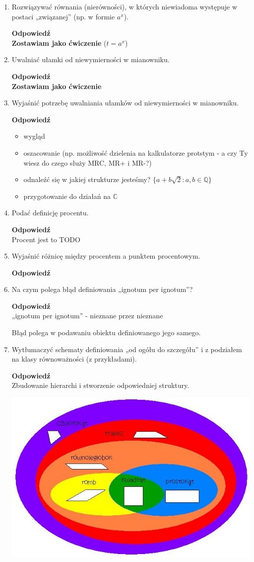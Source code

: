 \documentclass[12pt,a4paper]{article}
\theoremstyle{break}
\newcommand{\Odp}[1]{
		\begin{mdframed}[style=zadanie]
			\textbf{Odpowiedź}\\
			#1
		\end{mdframed}
	}
\begin{document}
\begin{enumerate}[1.]
	\item Rozwiązywać równania (nierówności), w których niewiadoma występuje w postaci	„związanej” (np. w formie $a^x$).
	\Odp{
		\textbf{Zostawiam jako ćwiczenie} ($t=a^x$)
	}
	
	\item Uwalniać ułamki od niewymierności w mianowniku.
	\Odp{
		\textbf{Zostawiam jako ćwiczenie}
	}
	
	\item Wyjaśnić potrzebę uwalniania ułamków od niewymierności w mianowniku.
	\Odp{
		\begin{itemize}
			\item wygląd
			\item oszacowanie (np. możliwość dzielenia na kalkulatorze protstym - a czy Ty wiesz do czego służy MRC, MR+ i MR-?)
			\item odnaleźć się w jakiej strukturze jesteśmy? $\{a+b\sqrt{2} : a,b\in\mathbb{Q}\}$
			\item przygotowanie do działań na $\mathbb{C}$
		\end{itemize}
	}
	
	\item Podać definicję procentu.
	\Odp{
		Procent jest to TODO
	}
	
	\item Wyjaśnić różnicę między procentem a punktem procentowym.
	\Odp{
	
	}
	
	\item Na czym polega błąd definiowania „ignotum per ignotum”?
	\Odp{
		„ignotum per ignotum” - nieznane przez nieznane
		
		Błąd polega w podawaniu obiektu definiowanego jego samego.  
	}
	
	\item Wytłumaczyć schematy definiowania „od ogółu do szczegółu” i z podziałem na klasy równoważności (z przykładami).
	\Odp{
		Zbudowanie hierarchi i stworzenie odpowiedniej struktury.
		
		\includegraphics[width=\linewidth]{czwor.jpg}
	}
	

\end{enumerate}
\end{document}

